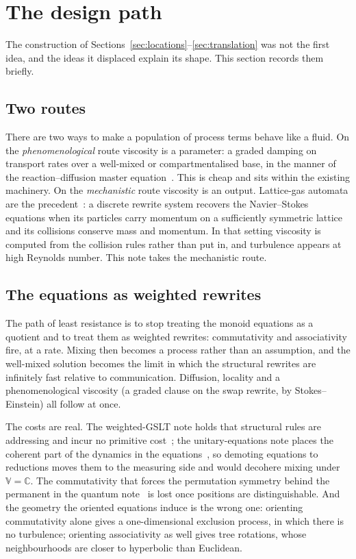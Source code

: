 \documentclass[11pt,a4paper]{article}
\theoremstyle{plain}
\theoremstyle{definition}
\theoremstyle{remark}
\newcommand{\V}{\mathbb{V}}
\newcommand{\Cx}{\mathbb{C}}
\begin{document}
\section{The design path}\label{sec:path}

The construction of Sections~\ref{sec:locations}--\ref{sec:translation} was
not the first idea, and the ideas it displaced explain its shape. This section
records them briefly.

\subsection{Two routes}

There are two ways to make a population of process terms behave like a fluid.
On the \emph{phenomenological} route viscosity is a parameter: a graded damping
on transport rates over a well-mixed or compartmentalised base, in the manner
of the reaction--diffusion master equation~\cite{Gardiner}. This is cheap and
sits within the existing machinery. On the \emph{mechanistic} route viscosity
is an output. Lattice-gas automata are the precedent~\cite{HPP,FHP,FHP87}: a
discrete rewrite system recovers the Navier--Stokes equations when its
particles carry momentum on a sufficiently symmetric lattice and its collisions
conserve mass and momentum. In that setting viscosity is computed from the
collision rules rather than put in, and turbulence appears at high Reynolds
number. This note takes the mechanistic route.

\subsection{The equations as weighted rewrites}

The path of least resistance is to stop treating the monoid equations as a
quotient and to treat them as weighted rewrites: commutativity and
associativity fire, at a rate. Mixing then becomes a process rather than an
assumption, and the well-mixed solution becomes the limit in which the
structural rewrites are infinitely fast relative to communication. Diffusion,
locality and a phenomenological viscosity (a graded clause on the swap rewrite,
by Stokes--Einstein) all follow at once.

The costs are real. The weighted-GSLT note holds that structural rules are
addressing and incur no primitive cost~\cite{WGSLT}; the unitary-equations
note places the coherent part of the dynamics in the equations~\cite{UE}, so
demoting equations to reductions moves them to the measuring side and would
decohere mixing under $\V=\Cx$. The commutativity that forces the permutation
symmetry behind the permanent in the quantum note~\cite{GWQ} is lost once
positions are distinguishable. And the geometry the oriented equations induce
is the wrong one: orienting commutativity alone gives a one-dimensional
exclusion process, in which there is no turbulence; orienting associativity as
well gives tree rotations, whose neighbourhoods are closer to hyperbolic than
Euclidean.
\end{document}
